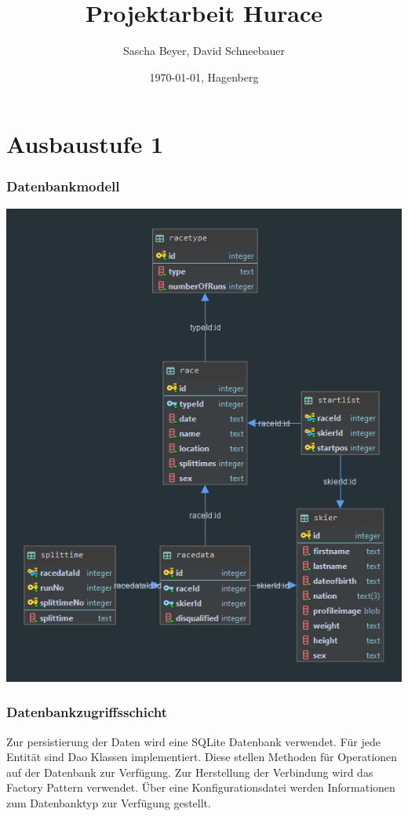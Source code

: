 \documentclass[a4paper, 12pt]{article}
\title{Projektarbeit Hurace}
\author{Sascha Beyer, David Schneebauer}
\date{\today{}, Hagenberg}
\begin{document}
	\maketitle
	\tableofcontents
	\newpage
	\section{Ausbaustufe 1}
	\subsubsection{Datenbankmodell}

	\includegraphics[width=.7\textwidth]{img/huraceDB.png}
	\subsubsection{Datenbankzugriffsschicht}
	Zur persistierung der Daten wird eine SQLite Datenbank verwendet.
	Für jede Entität sind Dao Klassen implementiert. Diese stellen Methoden für Operationen auf der Datenbank zur Verfügung. Zur Herstellung der Verbindung wird das Factory Pattern verwendet. Über eine Konfigurationsdatei werden Informationen zum Datenbanktyp zur Verfügung gestellt.
	 
	\newpage	
\end{document}
